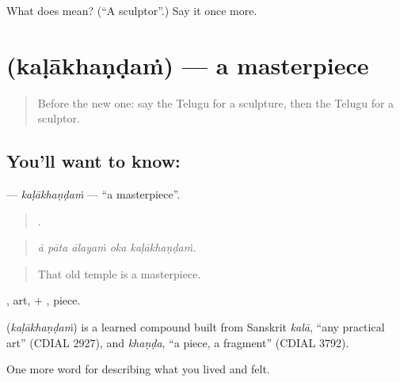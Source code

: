 \begin{tcolorbox}[breakable,colback=teal!4,colframe=teal!35!black,title={Before you move on}]
What does  mean? (\textquotedblleft{}A sculptor\textquotedblright{}.) Say it once more.
\end{tcolorbox}
\section[\texorpdfstring{\te{కళాఖండం} (kaḷākhaṇḍaṁ)}{కళాఖండం (kaḷākhaṇḍaṁ)}]{ (kaḷākhaṇḍaṁ) — a masterpiece}

\label{lesson:TE-C542-kalakhandam}



\begin{quote}
Before the new one: say the Telugu for a sculpture, then the Telugu for a sculptor.
\end{quote}

\subsection*{You'll want to know: }
\textbf{} — \emph{kaḷākhaṇḍaṁ} — \textquotedblleft{}a masterpiece\textquotedblright{}.

\begin{quote}
    .
\end{quote}

\begin{quote}
\emph{ā pāta ālayaṁ oka kaḷākhaṇḍaṁ.}
\end{quote}

\begin{quote}
That old temple is a masterpiece.
\end{quote}

, art, + , piece.

\begin{cousinweb}
\textbf{} (\emph{kaḷākhaṇḍaṁ}) is a learned compound built from Sanskrit \emph{kalā}, \textquotedblleft{}any practical art\textquotedblright{} (CDIAL 2927), and \emph{khaṇḍa}, \textquotedblleft{}a piece, a fragment\textquotedblright{} (CDIAL 3792).
\end{cousinweb}

\begin{grammarlens}[title={What you've built}]
One more word for describing what you lived and felt.
\end{grammarlens}

